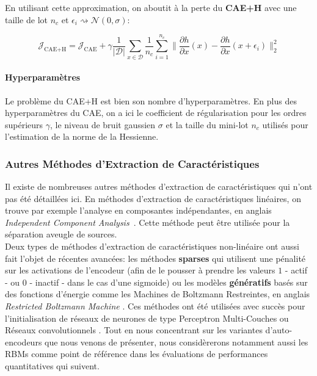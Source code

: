 En utilisant cette approximation,  on aboutit à la perte du \textbf{CAE+H} avec
une taille de lot $n_c$ et $\epsilon_i \rightsquigarrow \mathcal{N}(0,\sigma)$:

\begin{equation}
\mathcal{J}_\textrm{CAE+H} = \mathcal{J}_\textrm{CAE} + \gamma\frac{1}{\vert \mathcal{D}\vert}\sum_{x\in\mathcal{D}} \frac{1}{n_c}\sum^{n_c}_{i=1} \| \dfrac{\partial h}{\partial x}(x) - \dfrac{\partial h}{\partial x}(x+\epsilon_i) \|^2_2 
\label{eq:cae}
\end{equation}

\paragraph{Hyperparamètres} Le problème du CAE+H est bien son nombre
d'hyperparamètres. En plus des hyperparamètres du CAE, on a ici le coefficient
de régularisation pour les ordres supérieurs $\gamma$, le niveau de bruit
gaussien $\sigma$ et la taille du mini-lot $n_c$ utilisés pour l'estimation de
la norme de la Hessienne.

\subsubsection{Autres Méthodes d'Extraction de Caractéristiques}

Il existe de nombreuses autres méthodes d'extraction de caractéristiques qui
n'ont pas été détaillées ici. En méthodes d'extraction de
caractéristiques linéaires, on trouve par exemple l'analyse en composantes
indépendantes, en anglais \textit{Independent Component Analysis}~\cite{Comon94,Hyvarinen-2001}. Cette
méthode peut être utilisée pour la séparation aveugle de sources.
\\

Deux types de méthodes d'extraction de caractéristiques non-linéaire  ont aussi
fait l'objet de récentes avancées: les méthodes {\bf sparses}
\cite{ranzato-08,koray-psd-08,Koray-08} qui utilisent une pénalité sur les
activations de l'encodeur (afin de le pousser à prendre les valeurs $1$ - actif
- ou $0$ - inactif - dans le cas d'une sigmoide)  ou les modèles {\bf
génératifs} basés sur des fonctions d'énergie \cite{ranzato-unsup-07} comme les
Machines de Boltzmann Restreintes, en anglais \textit{Restricted Boltzmann
Machine} \cite{Tieleman08}.  Ces méthodes ont été utilisées avec succès pour
l'initialisation de réseaux de neurones de type Perceptron Multi-Couches
\cite{HintonG2006,ranzato-08,koray-psd-08,Koray-08} ou Réseaux convolutionnels
\cite{koray-nips-10-small}.  Tout en nous concentrant sur les variantes
d'auto-encodeurs que nous venons de présenter, nous considèrerons notamment
aussi les RBMs comme point de référence dans les évaluations de performances
quantitatives qui suivent.



